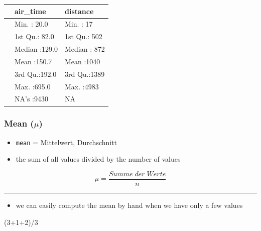 \documentclass[
  letterpaper,
  DIV=11]{scrartcl}
\newenvironment{Shaded}{\begin{snugshade}}{\end{snugshade}}
\newcommand{\DecValTok}[1]{\textcolor[rgb]{0.68,0.00,0.00}{#1}}
\newcommand{\NormalTok}[1]{\textcolor[rgb]{0.00,0.23,0.31}{#1}}
\newcommand{\SpecialCharTok}[1]{\textcolor[rgb]{0.37,0.37,0.37}{#1}}
\providecommand{\tightlist}{%
  \setlength{\itemsep}{0pt}\setlength{\parskip}{0pt}}\usepackage{longtable,booktabs,array}
\begin{document}
\begin{table}
\centering\begingroup\fontsize{30}{32}\selectfont

\begin{tabular}{l|l|l}
\hline
  &    air\_time &    distance\\
\hline
 & Min.   : 20.0 & Min.   :  17\\
\hline
 & 1st Qu.: 82.0 & 1st Qu.: 502\\
\hline
 & Median :129.0 & Median : 872\\
\hline
 & Mean   :150.7 & Mean   :1040\\
\hline
 & 3rd Qu.:192.0 & 3rd Qu.:1389\\
\hline
 & Max.   :695.0 & Max.   :4983\\
\hline
 & NA's   :9430 & NA\\
\hline
\end{tabular}
\endgroup{}
\end{table}

\hypertarget{mean-mu}{%
\subsubsection{\texorpdfstring{Mean
(\(\mu\))}{Mean (\textbackslash mu)}}\label{mean-mu}}

\begin{itemize}
\tightlist
\item
  \texttt{mean} = Mittelwert, Durchschnitt
\item
  the sum of all values divided by the number of values
\end{itemize}

\[
\mu = \frac{Summe\;der\;Werte}
           {n}
\]

\begin{center}\rule{0.5\linewidth}{0.5pt}\end{center}

\begin{itemize}
\tightlist
\item
  we can easily compute the mean by hand when we have only a few values
\end{itemize}

\begin{Shaded}
\begin{Highlighting}[]
\NormalTok{(}\DecValTok{3}\SpecialCharTok{+}\DecValTok{1}\SpecialCharTok{+}\DecValTok{2}\NormalTok{)}\SpecialCharTok{/}\DecValTok{3}
\end{Highlighting}
\end{Shaded}
\end{document}
